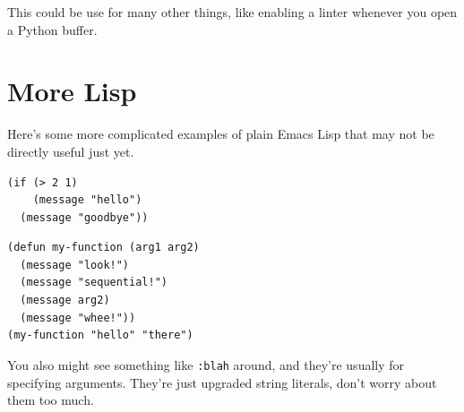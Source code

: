 \documentclass[letterpaper]{article}
\begin{document}
This could be use for many other things, like enabling a linter whenever you open a Python buffer.

\section{More Lisp}
\label{sec:orgf36139f}

Here's some more complicated examples of plain Emacs Lisp that may not be directly useful just yet.
\begin{verbatim}
(if (> 2 1)
    (message "hello")
  (message "goodbye"))  
\end{verbatim}

\begin{verbatim}
(defun my-function (arg1 arg2)
  (message "look!")
  (message "sequential!")
  (message arg2)
  (message "whee!"))
(my-function "hello" "there")
\end{verbatim}

You also might see something like \texttt{:blah} around, and they're usually for specifying arguments. They're just upgraded string literals, don't worry about them too much.
\end{document}
